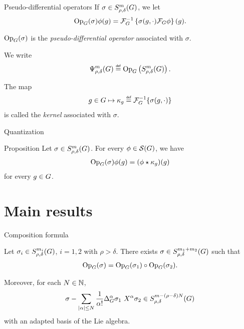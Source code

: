 \documentclass{beamer}
\begin{document}
\begin{frame}{Pseudo-differential operators}
    If $\sigma \in S^{m}_{\rho, \delta}(G)$,
    we let
    \begin{align*}
        \mathrm{Op}_{G}(\sigma) \phi(g) = \mathcal{F}^{-1}_{G} \left\{ \sigma(g, \cdot) \mathcal{F}_{G} \phi \right\}(g).
    \end{align*}

    $\mathrm{Op}_{G}(\sigma)$ is the \emph{pseudo-differential operator} associated with $\sigma$.

    We write
    \begin{align*}
        \OperatorClass m {\rho, \delta} \defeq \Op \left(\SymbolClass m {\rho, \delta}\right).
    \end{align*}

    \pause

    The map
    \begin{align*}
        g \in \Group \mapsto \kappa_g \defeq \InverseFourier \{\sigma(g, \dummy)\}
    \end{align*}
    is called the \emph{kernel} associated with $\sigma$.
\end{frame}

\begin{frame}{Quantization}
    \begin{block}{Proposition}
        Let $\sigma \in S^{m}_{\rho, \delta}(G)$.
        For every $\phi \in {\mathcal{S} (G)}$,
        we have
        \begin{align*}
            \mathrm{Op}_{G}(\sigma) \phi(g) = (\phi \star \kappa_g)(g)
        \end{align*}
        for every $g \in G$.
    \end{block}
\end{frame}

\section{Main results}

\begin{frame}{Composition formula}
    \begin{theorem}
        Let $\sigma_i \in S^{m_i}_{\rho, \delta}(G)$, $i = 1, 2$ with $\rho > \delta$.
        There exists $\sigma \in S^{m_1 + m_2}_{\rho, \delta}(G)$ such that
        \begin{align*}
            \mathrm{Op}_{G}(\sigma) = \mathrm{Op}_{G}(\sigma_1) \circ \mathrm{Op}_{G}(\sigma_2).
        \end{align*}

        Moreover,
        for each $N \in \mathbb{N}$,
        \begin{align*}
            \sigma - \sum_{\abs \alpha \leq N} \frac 1 {\alpha!} \DifferenceOperatorOrder {\alpha} \sigma_1 \ \LeftDifferentialOperator {\alpha} \sigma_2 \in \SymbolClass {m - (\rho - \delta) N} {\rho, \delta}
        \end{align*}
        with an adapted basis of the Lie algebra.
    \end{theorem}
\end{frame}
\end{document}

